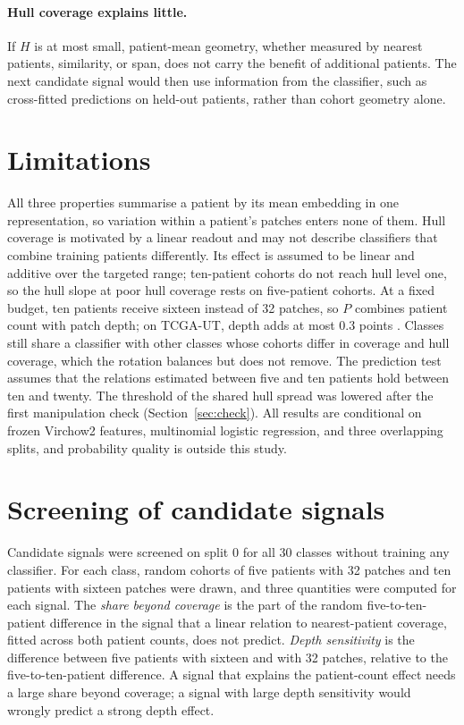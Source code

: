 \documentclass[11pt]{article}
\begin{document}
\paragraph{Hull coverage explains little.}
If $H$ is at most small, patient-mean geometry, whether measured by nearest patients, similarity, or span, does not carry the benefit of additional patients. The next candidate signal would then use information from the classifier, such as cross-fitted predictions on held-out patients, rather than cohort geometry alone.



\section{Limitations}
\label{sec:limitations}
All three properties summarise a patient by its mean embedding in one representation, so variation within a patient's patches enters none of them. Hull coverage is motivated by a linear readout and may not describe classifiers that combine training patients differently. Its effect is assumed to be linear and additive over the targeted range; ten-patient cohorts do not reach hull level one, so the hull slope at poor hull coverage rests on five-patient cohorts. At a fixed budget, ten patients receive sixteen instead of 32 patches, so $P$ combines patient count with patch depth; on TCGA-UT, depth adds at most 0.3 points \citep{queisler2026effectiveSupport}. Classes still share a classifier with other classes whose cohorts differ in coverage and hull coverage, which the rotation balances but does not remove. The prediction test assumes that the relations estimated between five and ten patients hold between ten and twenty. The threshold of the shared hull spread was lowered after the first manipulation check (Section~\ref{sec:check}). All results are conditional on frozen Virchow2 features, multinomial logistic regression, and three overlapping splits, and probability quality is outside this study.

\appendix
\section{Screening of candidate signals}
\label{app:screen}
Candidate signals were screened on split 0 for all 30 classes without training any classifier. For each class, random cohorts of five patients with 32 patches and ten patients with sixteen patches were drawn, and three quantities were computed for each signal. The \emph{share beyond coverage} is the part of the random five-to-ten-patient difference in the signal that a linear relation to nearest-patient coverage, fitted across both patient counts, does not predict. \emph{Depth sensitivity} is the difference between five patients with sixteen and with 32 patches, relative to the five-to-ten-patient difference. A signal that explains the patient-count effect needs a large share beyond coverage; a signal with large depth sensitivity would wrongly predict a strong depth effect.
\end{document}
